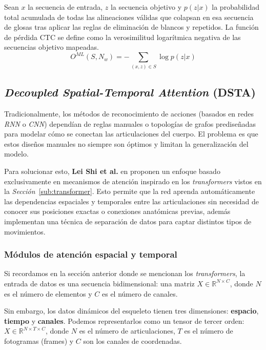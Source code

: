 Sean $x$ la secuencia de entrada, $z$ la secuencia objetivo y $p(z|x)$ la probabilidad total acumulada de todas las alineaciones válidas que colapsan en esa secuencia de glosas tras aplicar las reglas de eliminación de blancos y repetidos. La función de pérdida CTC se define como la verosimilitud logarítmica negativa de las secuencias objetivo mapeadas.
\begin{equation*}
O^{ML}(S,N_w)=-\sum_{(x,z)\in S}\log{p(z|x)}
\end{equation*}

\subsection{\textit{Decoupled Spatial-Temporal Attention} (DSTA)}\label{sec:DSTA}
Tradicionalmente, los métodos de reconocimiento de acciones (basados en redes \textit{RNN} o \textit{CNN}) dependían de reglas manuales o topologías de grafos prediseñadas para modelar cómo se conectan las articulaciones del cuerpo.
El problema es que estos diseños manuales no siempre son óptimos y limitan la generalización del modelo.

Para solucionar esto, \textbf{Lei Shi et al.} en \cite{DSTA} proponen un enfoque basado exclusivamente en mecanismos de atención inspirado en los \textit{transformers} vistos en la \textit{Sección}~\ref{sub:transformer}.
Esto permite que la red aprenda automáticamente las dependencias espaciales y temporales entre las articulaciones sin necesidad de conocer sus posiciones exactas o conexiones anatómicas previas, además implementan una técnica de separación de datos para captar distintos tipos de movimientos.

\subsubsection{Módulos de atención espacial y temporal}\label{seq:STA}
Si recordamos en la sección anterior donde se mencionan los \textit{transformers}, la entrada de datos es una secuencia bidimensional: una matriz $X\in \mathbb{R}^{N\times C}$, donde $N$ es el número de elementos y $C$ es el número de canales.

Sin embargo, los datos dinámicos del esqueleto tienen tres dimensiones: \textbf{espacio}, \textbf{tiempo} y \textbf{canales}.
Podemos representarlos como un tensor de tercer orden: $X\in \mathbb{R}^{N\times T\times C}$, donde $N$ es el número de articulaciones, $T$ es el número de fotogramas (frames) y $C$ son los canales de coordenadas.

